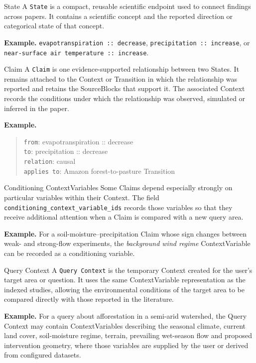 \documentclass[10pt,twocolumn]{article}
\begin{document}
\begin{definitionbox}{State}
A \texttt{State} is a compact, reusable scientific endpoint used to connect findings across papers. It contains a scientific concept and the reported direction or categorical state of that concept.

\textbf{Example.} \texttt{evapotranspiration :: decrease}, \texttt{precipitation :: increase}, or \texttt{near-surface air temperature :: increase}.
\end{definitionbox}

\begin{definitionbox}{Claim}
A \texttt{Claim} is one evidence-supported relationship between two States. It remains attached to the Context or Transition in which the relationship was reported and retains the SourceBlocks that support it. The associated Context records the conditions under which the relationship was observed, simulated or inferred in the paper.

\textbf{Example.}
\begin{quote}\small
\texttt{from}: evapotranspiration :: decrease\\
\texttt{to}: precipitation :: decrease\\
\texttt{relation}: causal\\
\texttt{applies to}: Amazon forest-to-pasture Transition
\end{quote}

\begin{subdefinitionbox}{Conditioning ContextVariables}
Some Claims depend especially strongly on particular variables within their Context. The field \texttt{conditioning\_context\_variable\_ids} records those variables so that they receive additional attention when a Claim is compared with a new query area.

\textbf{Example.} For a soil-moisture--precipitation Claim whose sign changes between weak- and strong-flow experiments, the \emph{background wind regime} ContextVariable can be recorded as a conditioning variable.
\end{subdefinitionbox}
\end{definitionbox}

\begin{definitionbox}{Query Context}
A \texttt{Query Context} is the temporary Context created for the user's target area or question. It uses the same ContextVariable representation as the indexed studies, allowing the environmental conditions of the target area to be compared directly with those reported in the literature.

\textbf{Example.} For a query about afforestation in a semi-arid watershed, the Query Context may contain ContextVariables describing the seasonal climate, current land cover, soil-moisture regime, terrain, prevailing wet-season flow and proposed intervention geometry, where those variables are supplied by the user or derived from configured datasets.
\end{definitionbox}
\end{document}
